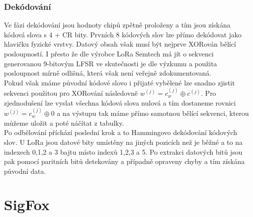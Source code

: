 \documentclass{ctuthesis}
\begin{document}
\subsubsection{Dekódování}
Ve fázi dekódování jsou hodnoty chipů zpětně proloženy a tím jsou získána kódová slova s 4 + CR bity. Prvních 8 kódových slov lze přímo dekódovat jako hlavičku fyzické vrstvy. Datový obsah však musí být nejprve XORován bělící posloupností. I přesto že dle výrobce LoRa Semtech má jít o sekvenci generovanou 9-bitovým LFSR ve skutečnosti je dle výzkumu \cite{gr-lora2016} a \cite{limesdrlora} použita posloupnost mírně odlišná, která však není veřejně zdokumentovaná.\\
Pokud však známe původní  kódové slovo i přijaté vybělené lze snadno zjistit sekvenci použitou pro XORování následovně
$w^{(j)} = c_w^{(j)} \oplus c^{(j)}$. Pro zjednodušení lze vyslat všechna kódová slova nulová a tím dostaneme rovnici $w^{(j)} = c_w^{(j)} \oplus 0$ a na výstupu tak máme přímo samotnou bělící sekvenci, kterou můžeme uložit a poté náčítat z tabulky. \\
Po odbělování příchází poslední krok a to Hammingovo dekódování kódových slov. U LoRa jsou datové bity umístěny na jiných pozicích než je běžné a to na indexech 0,1,2 a 3 bajtu místo indexů 1,2,3 a 5. Po extrakci datových bitů jsou pak pomocí paritních bitů detekovány a případně opraveny chyby a tím získána původní data.


\section{SigFox}
\end{document}
